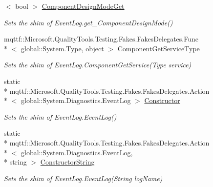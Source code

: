 \begin{DoxyCompactItemize}
$<$ bool $>$ \hyperlink{class_system_1_1_diagnostics_1_1_fakes_1_1_shim_event_log_abe2f78e947fc17eebe7bdcee043d7317}{Component\-Design\-Mode\-Get}
\begin{DoxyCompactList}\small\item\em Sets the shim of Event\-Log.\-get\-\_\-\-Component\-Design\-Mode()\end{DoxyCompactList}\item 
mqttf\-::\-Microsoft.\-Quality\-Tools.\-Testing.\-Fakes.\-Fakes\-Delegates.\-Func\\*
$<$ global\-::\-System.\-Type, object $>$ \hyperlink{class_system_1_1_diagnostics_1_1_fakes_1_1_shim_event_log_a9528bca6df0b3e8fbd1b09cc051a2531}{Component\-Get\-Service\-Type}
\begin{DoxyCompactList}\small\item\em Sets the shim of Event\-Log.\-Component\-Get\-Service(\-Type service)\end{DoxyCompactList}\item 
static \\*
mqttf\-::\-Microsoft.\-Quality\-Tools.\-Testing.\-Fakes.\-Fakes\-Delegates.\-Action\\*
$<$ global\-::\-System.\-Diagnostics.\-Event\-Log $>$ \hyperlink{class_system_1_1_diagnostics_1_1_fakes_1_1_shim_event_log_a7dfd53b57bce436f3b913b373104f8c3}{Constructor}
\begin{DoxyCompactList}\small\item\em Sets the shim of Event\-Log.\-Event\-Log()\end{DoxyCompactList}\item 
static \\*
mqttf\-::\-Microsoft.\-Quality\-Tools.\-Testing.\-Fakes.\-Fakes\-Delegates.\-Action\\*
$<$ global\-::\-System.\-Diagnostics.\-Event\-Log, \\*
string $>$ \hyperlink{class_system_1_1_diagnostics_1_1_fakes_1_1_shim_event_log_a4653ec5aad280e206dbf608e90f6b3c2}{Constructor\-String}
\begin{DoxyCompactList}\small\item\em Sets the shim of Event\-Log.\-Event\-Log(\-String log\-Name)\end{DoxyCompactList}\item 

\end{DoxyCompactItemize}
